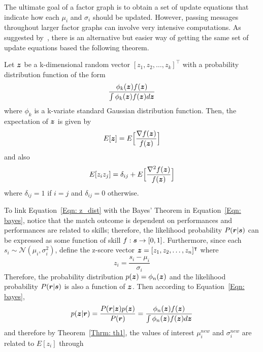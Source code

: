 The ultimate goal of a factor graph is to obtain a set of update equations that indicate how each $\mu_{i}$ and $\sigma_{i}$ should be updated. However, passing messages throughout larger factor graphs can involve very intensive computations. As suggested by~\cite{RC11}, there is an alternative but easier way of getting the same set of update equations based the following theorem. 
\begin{theorem}\label{Thrm: th1}
Let $\bm{z}$ be a k-dimensional random vector $[z_{1}, z_{2}, \ldots, z_{k}]^{\intercal}$ with a probability distribution function of the form
\begin{equation}\label{Eqn: z_dist}
\frac{\phi_{k}(\bm{z})f(\bm{z})}{\int \phi_{k}(\bm{z})f(\bm{z})d\bm{z}}
\end{equation}
where $\phi_{k}$ is a k-variate standard Gaussian distribution function. Then, the expectation of $\bm{z}$ is given by
\begin{equation}
E[\bm{z}] = E\Big{[}\frac{\nabla f(\bm{z})}{f(\bm{z})}\Big{]}
\end{equation}
and also
\begin{equation}
E[z_{i}z_{j}] = \delta_{ij} + E\Big{[}\frac{\nabla^{2} f(\bm{z})}{f(\bm{z})}\Big{]}
\end{equation}
where $\delta_{ij} = 1$ if $i = j$ and $\delta_{ij} = 0$ otherwise. 
\end{theorem}

To link Equation~\ref{Eqn: z_dist} with the Bayes' Theorem in Equation~\ref{Eqn: bayes}, notice that the match outcome is dependent on performances and performances are related to skills; therefore, the likelihood probability $P(\bm{r} | \bm{s})$ can be expressed as some function of skill $f : \bm{s} \rightarrow [0, 1]$. Furthermore, since each $s_{i} \sim \mathcal{N}(\mu_{i}, \sigma_{i}^{2})$, define the z-score vector $\bm{z} = [z_{1}, z_{2}, \ldots, z_{n}]^{\intercal}$ where 
\begin{equation}
z_{i} = \frac{s_{i} - \mu_{i}}{\sigma_{i}} 
\end{equation}
Therefore, the probability distribution $p(\bm{z}) = \phi_{n}(\bm{z})$ and the likelihood probability $P(\bm{r} | \bm{s})$ is also a function of $\bm{z}$. Then according to Equation~\ref{Eqn: bayes}, 
\begin{equation}
p(\bm{z} | \bm{r}) = \frac{P(\bm{r} | \bm{z})p(\bm{z})}{P(\bm{r})} = \frac{\phi_{n}(\bm{z})f(\bm{z})}{\int \phi_{n}(\bm{z})f(\bm{z})d\bm{z}}
\end{equation}
and therefore by Theorem~\ref{Thrm: th1}, the values of interest $\mu_{i}^{new}$ and $\sigma_{i}^{new}$ are related to $E[z_{i}]$ through

